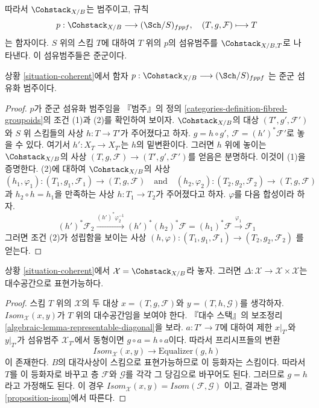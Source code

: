 \noindent
따라서 $\Cohstack_{X/B}$는 범주이고, 규칙
$$
p : \Cohstack_{X/B} \longrightarrow (\Sch/S)_{fppf},
\quad
(T, g, \mathcal{F}) \longmapsto T
$$
는 함자이다. $S$ 위의 스킴 $T$에 대하여 $T$ 위의 $p$의
섬유범주를 $\Cohstack_{X/B, T}$로 나타낸다. 이 섬유범주들은 준군이다.

\begin{lemma}
\label{lemma-coherent-fibred-in-groupoids}
상황 \ref{situation-coherent}에서 함자
$p : \Cohstack_{X/B} \longrightarrow (\Sch/S)_{fppf}$
는 준군 섬유화 범주이다.
\end{lemma}

\begin{proof}
$p$가 준군 섬유화 범주임을 『범주』의 정의
\ref{categories-definition-fibred-groupoids}의 조건 (1)과 (2)를
확인하여 보이자. $\Cohstack_{X/B}$의 대상
$(T', g', \mathcal{F}')$와 $S$ 위 스킴들의 사상
$h : T \to T'$가 주어졌다고 하자. $g = h \circ g'$,
$\mathcal{F} = (h')^*\mathcal{F}'$로 놓을 수 있다. 여기서
$h' : X_T \to X_{T'}$는 $h$의 밑변환이다.
그러면 $h$ 위에 놓이는 $\Cohstack_{X/B}$의 사상
$(T, g, \mathcal{F}) \to (T', g', \mathcal{F}')$를 얻음은 분명하다.
이것이 (1)을 증명한다. (2)에 대하여 $\Cohstack_{X/B}$의 사상
$$
(h_1, \varphi_1) : (T_1, g_1, \mathcal{F}_1) \to (T, g, \mathcal{F})
\quad\text{and}\quad
(h_2, \varphi_2) : (T_2, g_2, \mathcal{F}_2) \to (T, g, \mathcal{F})
$$
과 $h_2 \circ h = h_1$을 만족하는 사상 $h : T_1 \to T_2$가
주어졌다고 하자. $\varphi$를 다음 합성이라 하자.
$$
(h')^*\mathcal{F}_2
\xrightarrow{(h')^*\varphi_2^{-1}}
(h')^*(h_2)^*\mathcal{F} = (h_1)^*\mathcal{F}
\xrightarrow{\varphi_1}
\mathcal{F}_1
$$
그러면 조건 (2)가 성립함을 보이는 사상
$(h, \varphi) : (T_1, g_1, \mathcal{F}_1) \to (T_2, g_2, \mathcal{F}_2)$
를 얻는다.
\end{proof}

\begin{lemma}
\label{lemma-coherent-diagonal}
상황 \ref{situation-coherent}에서
$\mathcal{X} = \Cohstack_{X/B}$라 놓자.
그러면 $\Delta : \mathcal{X} \to \mathcal{X} \times \mathcal{X}$는
대수공간으로 표현가능하다.
\end{lemma}

\begin{proof}
스킴 $T$ 위의 $\mathcal{X}$의 두 대상
$x = (T, g, \mathcal{F})$와 $y = (T, h, \mathcal{G})$를 생각하자.
$\mathit{Isom}_\mathcal{X}(x, y)$가 $T$ 위의 대수공간임을 보여야 한다.
『대수 스택』의 보조정리
\ref{algebraic-lemma-representable-diagonal}을 보라.
$a : T' \to T$에 대하여 제한 $x|_{T'}$와 $y|_{T'}$가 섬유범주
$\mathcal{X}_{T'}$에서 동형이면 $g \circ a = h \circ a$이다.
따라서 프리시프들의 변환
$$
\mathit{Isom}_\mathcal{X}(x, y) \longrightarrow \text{Equalizer}(g, h)
$$
이 존재한다. $B$의 대각사상이 스킴으로 표현가능하므로 이 등화자는
스킴이다. 따라서 $T$를 이 등화자로 바꾸고 층 $\mathcal{F}$와
$\mathcal{G}$를 각각 그 당김으로 바꾸어도 된다. 그러므로
$g = h$라고 가정해도 된다. 이 경우
$\mathit{Isom}_\mathcal{X}(x, y) = \mathit{Isom}(\mathcal{F}, \mathcal{G})$
이고, 결과는 명제 \ref{proposition-isom}에서 따른다.
\end{proof}

